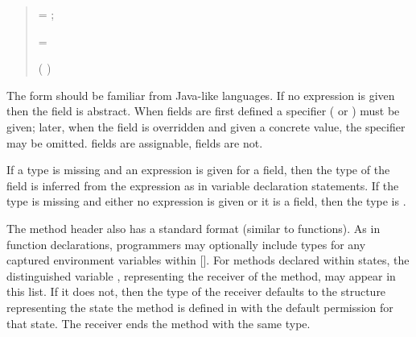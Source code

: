 \begin{quote}




 {}  =   ;


 {}

 {}


 {}   = 


 {}  

 {}  





 {}    (  )


 {}  


 {} 

\end{quote}

The  form should be familiar from Java-like
languages.  If no expression is given then the field is abstract.  
When fields are first defined a specifier ( or )
must be given; later, when the field is overridden and given a concrete
value, the specifier may be omitted.
 fields are assignable,  fields
are not.

If a type is missing and an expression is given for a
   field, then the type of the field is inferred from the
  expression as in variable declaration statements.  
  If the type is missing and either no expression is
  given or it is a  field, then the type is .

The method header  also has a standard format (similar to
functions).  As in function declarations, programmers may optionally
include types for any captured environment variables within []. For methods
declared within states, the distinguished variable ,
representing the receiver of the method, may appear in this list.  If
it does not, then the type of the receiver defaults to the structure
representing the state the method is defined in with the default
permission for that state.  The receiver ends the method with the same
type.

